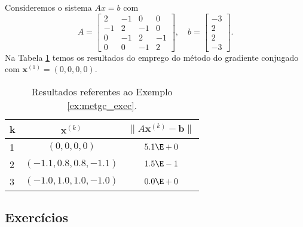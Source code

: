 \begin{ex}\label{ex:metgc_exec}
  Consideremos o sistema $Ax = b$ com
  \begin{equation}
    A =
    \begin{bmatrix}
      2 & -1 & 0 & 0\\
      -1 & 2 & -1 & 0\\
      0 & -1 & 2 & -1 \\
      0 & 0 & -1 & 2
    \end{bmatrix},\quad
    b =
    \begin{bmatrix}
      -3\\
      2\\
      2\\
      -3
    \end{bmatrix}.
  \end{equation}
  Na Tabela \ref{tab:metgc_exec} temos os resultados do emprego do método do gradiente conjugado com $\pmb{x}^{(1)} = (0, 0, 0, 0)$.

  \begin{table}[h!]
    \centering
    \caption{Resultados referentes ao Exemplo \ref{ex:metgc_exec}.}
    \label{tab:metgc_exec}
    \begin{tabular}{l|c|c}
      k & $\pmb{x}^{(k)}$ & $\|A\pmb{x}^{(k)}-\pmb{b}\|$\\\hline
      1 & $(0, 0, 0, 0)$ & $5.1\E+0$\\
      2 & $(-1.1, 0.8, 0.8, -1.1)$ & $1.5\E-1$\\
      3 & $(-1.0, 1.0, 1.0, -1.0)$ & $0.0\E+0$\\\hline
    \end{tabular}
  \end{table}

% 
\end{ex}

\subsection*{Exercícios}

\emconstrucao